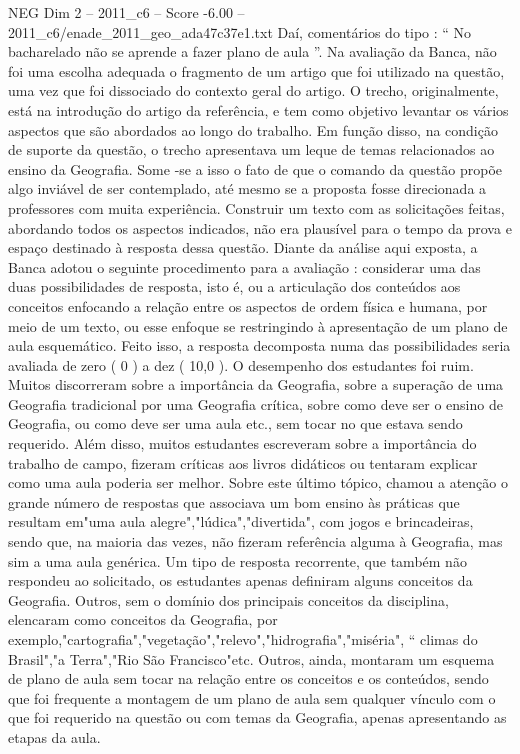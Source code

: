 \begin{textsample}{NEG Dim 2 – 2011\_c6 – Score -6.00 – 2011\_c6/enade\_2011\_geo\_ada47c37e1.txt}
Daí, comentários do tipo : “ No bacharelado não se aprende a fazer plano de aula ”.
Na avaliação da Banca, não foi uma escolha adequada o fragmento de um artigo que foi utilizado na questão, uma vez que foi dissociado do contexto geral do artigo.
O trecho, originalmente, está na introdução do artigo da referência, e tem como objetivo levantar os vários aspectos que são abordados ao longo do trabalho.
Em função disso, na condição de suporte da questão, o trecho apresentava um leque de temas relacionados ao ensino da Geografia.
Some -se a isso o fato de que o comando da questão propõe algo inviável de ser contemplado, até mesmo se a proposta fosse direcionada a professores com muita experiência.
Construir um texto com as solicitações feitas, abordando todos os aspectos indicados, não era plausível para o tempo da prova e espaço destinado à resposta dessa questão.
Diante da análise aqui exposta, a Banca adotou o seguinte procedimento para a avaliação : considerar uma das duas possibilidades de resposta, isto é, ou a articulação dos conteúdos aos conceitos enfocando a relação entre os aspectos de ordem física e humana, por meio de um texto, ou esse enfoque se restringindo à apresentação de um plano de aula esquemático.
Feito isso, a resposta decomposta numa das possibilidades seria avaliada de zero ( 0 ) a dez ( 10,0 ).
O desempenho dos estudantes foi ruim.
Muitos discorreram sobre a importância da Geografia, sobre a superação de uma Geografia tradicional por uma Geografia crítica, sobre como deve ser o ensino de Geografia, ou como deve ser uma aula etc., sem tocar no que estava sendo requerido.
Além disso, muitos estudantes escreveram sobre a importância do trabalho de campo, fizeram críticas aos livros didáticos ou tentaram explicar como uma aula poderia ser melhor.
Sobre este último tópico, chamou a atenção o grande número de respostas que associava um bom ensino às práticas que resultam em"uma aula alegre","lúdica","divertida", com jogos e brincadeiras, sendo que, na maioria das vezes, não fizeram referência alguma à Geografia, mas sim a uma aula genérica.
Um tipo de resposta recorrente, que também não respondeu ao solicitado, os estudantes apenas definiram alguns conceitos da Geografia.
Outros, sem o domínio dos principais conceitos da disciplina, elencaram como conceitos da Geografia, por exemplo,"cartografia","vegetação","relevo","hidrografia","miséria", “ climas do Brasil","a Terra","Rio São Francisco"etc.
Outros, ainda, montaram um esquema de plano de aula sem tocar na relação entre os conceitos e os conteúdos, sendo que foi frequente a montagem de um plano de aula sem qualquer vínculo com o que foi requerido na questão ou com temas da Geografia, apenas apresentando as etapas da aula.

\end{textsample}
